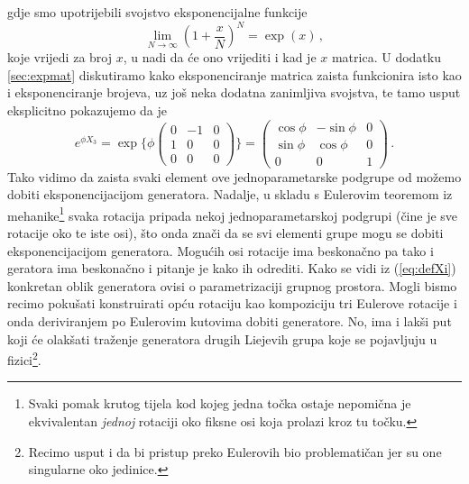 gdje smo upotrijebili svojstvo eksponencijalne funkcije
\begin{equation}
    \lim_{N\to\infty}\left(1 + \frac{x}{N}\right)^N = \exp(x) \,,
\end{equation}
koje vrijedi za broj $x$,
u nadi da će ono vrijediti i kad je $x$ matrica.
U dodatku \ref{sec:expmat} diskutiramo
kako eksponenciranje matrica zaista funkcionira isto kao i
eksponenciranje brojeva, uz još neka dodatna zanimljiva svojstva,
te tamo usput eksplicitno pokazujemo da je
\begin{equation}
e^{\phi X_3} = \exp\Bigg\{ 
    \phi  \begin{pmatrix}
0 & -1 & 0 \\
1 & 0 & 0 \\
0 & 0 & 0 
\end{pmatrix}\Bigg\} =
\begin{pmatrix}
\cos\phi & -\sin\phi & 0 \\
\sin\phi & \cos\phi & 0 \\
0 & 0 & 1 \end{pmatrix} \,.
\end{equation}
Tako vidimo da zaista svaki element ove jednoparametarske podgrupe
od  možemo dobiti eksponencijacijom generatora.
Nadalje, u skladu s Eulerovim teoremom iz mehanike\footnote{Svaki pomak krutog
tijela kod kojeg jedna točka ostaje nepomična je ekvivalentan \emph{jednoj}
rotaciji oko fiksne osi koja prolazi kroz tu točku.} svaka  rotacija 
pripada nekoj jednoparametarskoj podgrupi
 (čine je sve rotacije oko te iste osi), što onda znači da se
svi elementi grupe  mogu se dobiti eksponencijacijom generatora.
Mogućih osi rotacije ima beskonačno pa tako i geratora ima beskonačno
i pitanje je kako ih odrediti.
Kako se vidi iz (\ref{eq:defXi}) konkretan oblik generatora ovisi
o parametrizaciji grupnog prostora. 
Mogli bismo recimo pokušati konstruirati opću rotaciju kao kompoziciju tri
 Eulerove rotacije i onda deriviranjem po Eulerovim kutovima dobiti
 generatore. No, ima i lakši put koji će olakšati traženje 
 generatora drugih Liejevih grupa koje se pojavljuju u fizici\footnote{Recimo
     usput i da bi pristup preko Eulerovih
     bio  problematičan jer su one singularne oko jedinice.}.

